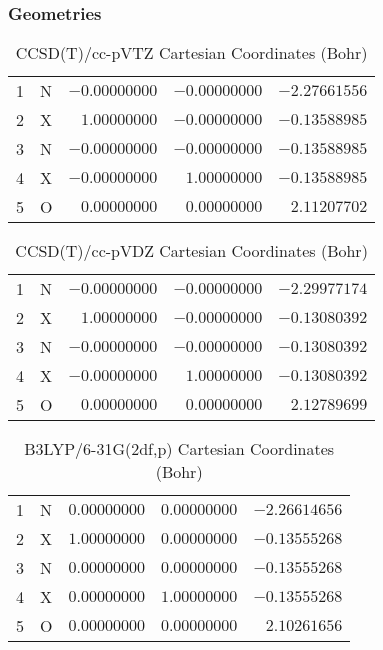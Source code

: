 \documentclass[10pt,oneside]{article}
\begin{document}
\subsubsection*{Geometries}
\begin{table}[h!]
\centering
\caption{CCSD(T)/cc-pVTZ Cartesian Coordinates (Bohr)}
\begin{tabular}{llrrr}
1  & N  & $-0.00000000$ & $-0.00000000$ & $-2.27661556$ \\
2  & X  & $ 1.00000000$ & $-0.00000000$ & $-0.13588985$ \\
3  & N  & $-0.00000000$ & $-0.00000000$ & $-0.13588985$ \\
4  & X  & $-0.00000000$ & $ 1.00000000$ & $-0.13588985$ \\
5  & O  & $ 0.00000000$ & $ 0.00000000$ & $ 2.11207702$ \\
\end{tabular}
\end{table}

\begin{table}[h!]
\centering
\caption{CCSD(T)/cc-pVDZ Cartesian Coordinates (Bohr)}
\begin{tabular}{llrrr}
1  & N  & $-0.00000000$ & $-0.00000000$ & $-2.29977174$ \\
2  & X  & $ 1.00000000$ & $-0.00000000$ & $-0.13080392$ \\
3  & N  & $-0.00000000$ & $-0.00000000$ & $-0.13080392$ \\
4  & X  & $-0.00000000$ & $ 1.00000000$ & $-0.13080392$ \\
5  & O  & $ 0.00000000$ & $ 0.00000000$ & $ 2.12789699$ \\
\end{tabular}
\end{table}

\begin{table}[h!]
\centering
\caption{B3LYP/6-31G(2df,p) Cartesian Coordinates (Bohr)}
\begin{tabular}{llrrr}
1  & N  & $ 0.00000000$ & $ 0.00000000$ & $-2.26614656$ \\
2  & X  & $ 1.00000000$ & $ 0.00000000$ & $-0.13555268$ \\
3  & N  & $ 0.00000000$ & $ 0.00000000$ & $-0.13555268$ \\
4  & X  & $ 0.00000000$ & $ 1.00000000$ & $-0.13555268$ \\
5  & O  & $ 0.00000000$ & $ 0.00000000$ & $ 2.10261656$ \\
\end{tabular}
\end{table}
\end{document}
